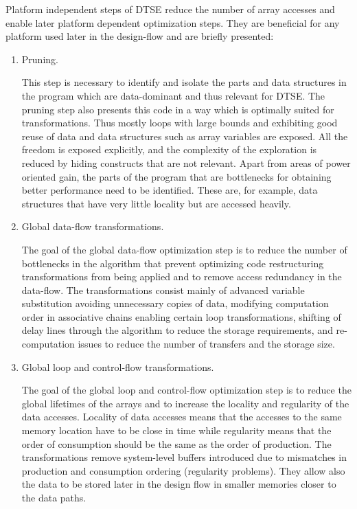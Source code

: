 Platform independent steps of DTSE reduce the number of array accesses and enable later platform dependent optimization steps. 
They are beneficial for any platform used later in the design-flow and are briefly presented:

\begin{enumerate}

\item Pruning.

This step is necessary to identify and isolate the parts and data structures in the program which are data-dominant and thus relevant for DTSE. 
The pruning step also presents this code in a way which is optimally suited for transformations. 
Thus mostly loops with large bounds and exhibiting good reuse of data and data structures such as array variables are exposed.
 All the freedom is exposed explicitly, and the complexity of the exploration is reduced by hiding constructs that are not relevant. 
 Apart from areas of power oriented gain, the parts of the program that are bottlenecks for obtaining better performance need to be identified. 
 These are, for example, data structures that have very little locality but are accessed heavily.
 
 \item Global data-flow transformations.
 
 The goal of the global data-flow optimization step is to reduce the number of bottlenecks in the algorithm that prevent optimizing code restructuring transformations from being applied and to remove access redundancy in the data-flow. 
 The transformations consist mainly of advanced variable substitution avoiding unnecessary copies of data, modifying computation order in associative chains enabling certain loop transformations, shifting of delay lines through the algorithm to reduce the storage requirements, and re-computation issues to reduce the number of transfers and the storage size. 
 
 \item Global loop and control-flow transformations.
 
 The goal of the global loop and control-flow optimization step is to reduce the global lifetimes of the arrays and to increase the locality and regularity of the data accesses.
  Locality of data accesses means that the accesses to the same memory location have to be close in time while regularity means that the order of consumption should be the same as the order of production. 
  The transformations remove system-level buffers introduced due to mismatches in production and consumption ordering (regularity problems). 
  They allow also the data to be stored later in the design flow in smaller memories closer to the data paths.
  

\end{enumerate}
